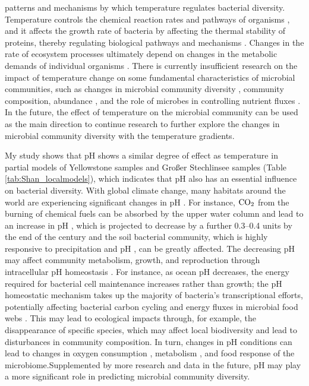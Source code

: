 \documentclass[11pt, a4paper]{article}
\begin{document}
\begin{spacing}{1.5}
patterns and mechanisms by which temperature regulates bacterial diversity. Temperature controls the chemical reaction rates and pathways of organisms \citep{birgander2018responses, dacal2019soil,walker2018microbial}, and it affects the growth rate of bacteria by affecting the thermal stability of proteins, thereby regulating biological pathways and mechanisms \citep{corkrey2012universality}. Changes in the rate of ecosystem processes ultimately depend on changes in the metabolic demands of individual organisms \citep{zhou2016temperature}.  There is currently insufficient research on the impact of temperature change on some fundamental characteristics of microbial communities, such as changes in microbial community diversity \citep{delgado2016microbial}, community composition, abundance \citep{maestre2015increasing}, and the role of microbes in controlling nutrient fluxes \citep{azam2007microbial, thornton2014dissolved}. In the future, the effect of temperature on the microbial community can be used as the main direction to continue research to further explore the changes in microbial community diversity with the temperature gradients.

My study shows that pH shows a similar degree of effect as temperature in partial models of Yellowstone samples and Großer Stechlinsee samples (Table \ref{tab:Shan_localmodels}), which indicates that pH also has an essential influence on bacterial diversity. With global climate change, many habitats around the world are experiencing significant changes in pH \citep{caldeira2003anthropogenic, cavicchioli2019scientists}. For instance, ${\rm CO_{2}}$ from the burning of chemical fuels can be absorbed by the upper water column and lead to an increase in pH \citep{houghton2001climate}, which is projected to decrease by a further 0.3–0.4 units by the end of the century \citep{hurd2018current} and the soil bacterial community, which is highly responsive to precipitation and pH \citep{bahram2018structure}, can be greatly affected. The decreasing pH may affect community metabolism, growth, and reproduction through intracellular pH homeostasis \citep{melzner2009physiological}. For instance, as ocean pH decreases, the energy required for bacterial cell maintenance increases rather than growth; the pH homeostatic mechanism takes up the majority of bacteria's transcriptional efforts, potentially affecting bacterial carbon cycling and energy fluxes in microbial food webs \citep{bunse2016response}. This may lead to ecological impacts through, for example, the disappearance of specific species, which may affect local biodiversity and lead to disturbances in community composition. In turn, changes in pH conditions can lead to changes in oxygen consumption \citep{bunse2016response}, metabolism \citep{arnosti2011dynamics, grossart2006testing}, and food response \citep{piontek2010acidification} of the microbiome.Supplemented by more research and data in the future, pH may play a more significant role in predicting microbial community diversity.


\end{spacing}
\end{document}
